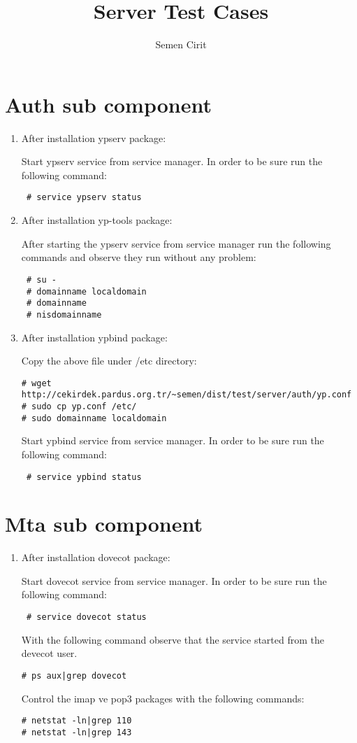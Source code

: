 \documentclass[a4paper,10pt]{article}
\title{Server Test Cases}
\author{Semen Cirit}
\begin{document}
\maketitle
\section{Auth sub component}
\begin{enumerate}
 \item After installation ypserv package:

Start ypserv service from service manager. In order to be sure run the following command:
\begin{verbatim}
 # service ypserv status
\end{verbatim}

\item After installation yp-tools package:

After starting the ypserv service from service manager run the following commands and observe they run without any problem:
\begin{verbatim}
 # su -
 # domainname localdomain
 # domainname
 # nisdomainname
\end{verbatim}

\item After installation ypbind package:

Copy the above file under /etc directory:
\begin{verbatim}
# wget http://cekirdek.pardus.org.tr/~semen/dist/test/server/auth/yp.conf 
# sudo cp yp.conf /etc/
# sudo domainname localdomain
\end{verbatim}

Start ypbind service from service manager. In order to be sure run the following command:
\begin{verbatim}
 # service ypbind status
\end{verbatim}

\end{enumerate}

\section{Mta sub component }
\begin{enumerate}
 \item After installation dovecot package:

Start dovecot service from service manager.  In order to be sure run the following command:
\begin{verbatim}
 # service dovecot status
\end{verbatim}
 With the following command observe that the service started from the devecot user.
\begin{verbatim}
# ps aux|grep dovecot 
\end{verbatim}

Control the imap ve pop3 packages with the following commands:
\begin{verbatim}
# netstat -ln|grep 110
# netstat -ln|grep 143
\end{verbatim}

\end{enumerate}
\end{document}
